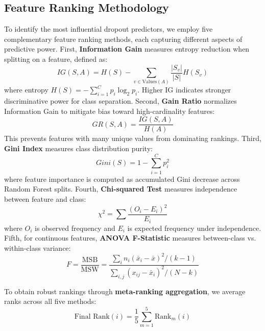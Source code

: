 \documentclass[journal]{IEEEtran}
\begin{document}
\subsection{Feature Ranking Methodology}

To identify the most influential dropout predictors, we employ five complementary feature ranking methods, each capturing different aspects of predictive power. First, \textbf{Information Gain} measures entropy reduction when splitting on a feature, defined as:
\begin{equation}
IG(S, A) = H(S) - \sum_{v \in \text{Values}(A)} \frac{|S_v|}{|S|} H(S_v)
\end{equation}
where entropy $H(S) = -\sum_{i=1}^{C} p_i \log_2 p_i$. Higher IG indicates stronger discriminative power for class separation. Second, \textbf{Gain Ratio} normalizes Information Gain to mitigate bias toward high-cardinality features:
\begin{equation}
GR(S, A) = \frac{IG(S, A)}{H(A)}
\end{equation}
This prevents features with many unique values from dominating rankings. Third, \textbf{Gini Index} measures class distribution purity:
\begin{equation}
Gini(S) = 1 - \sum_{i=1}^{C} p_i^2
\end{equation}
where feature importance is computed as accumulated Gini decrease across Random Forest splits. Fourth, \textbf{Chi-squared Test} measures independence between feature and class:
\begin{equation}
\chi^2 = \sum \frac{(O_i - E_i)^2}{E_i}
\end{equation}
where $O_i$ is observed frequency and $E_i$ is expected frequency under independence. Fifth, for continuous features, \textbf{ANOVA F-Statistic} measures between-class vs. within-class variance:
\begin{equation}
F = \frac{\text{MSB}}{\text{MSW}} = \frac{\sum_{i} n_i (\bar{x}_i - \bar{x})^2 / (k-1)}{\sum_{i,j} (x_{ij} - \bar{x}_i)^2 / (N-k)}
\end{equation}

To obtain robust rankings through \textbf{meta-ranking aggregation}, we average ranks across all five methods:
\begin{equation}
\text{Final Rank}(i) = \frac{1}{5} \sum_{m=1}^{5} \text{Rank}_m(i)
\end{equation}
\end{document}
